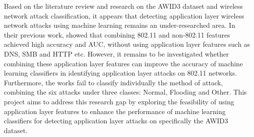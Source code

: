 Based on the literature review and research on the AWID3 dataset and wireless network attack classification, it appears that detecting application layer wireless network attacks using machine learning remains an under-researched area. In their previous work, \textcite{s22155633} showed that combining 802.11 and non-802.11 features achieved high accuracy and AUC, without using application layer features such as DNS, SMB and HTTP etc. However, it remains to be investigated whether combining these application layer features can improve the accuracy of machine learning classifiers in identifying application layer attacks on 802.11 networks. Furthermore, the works fail to classify individually the method of attack, combining the six attacks under three classes: Normal, Flooding and Other. This project aims to address this research gap by exploring the feasibility of using application layer features to enhance the performance of machine learning classifiers for detecting application layer attacks on specifically the AWID3 dataset.